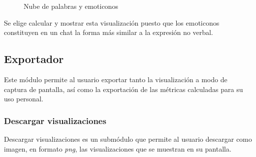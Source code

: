 \begin{figure}[H]
	\centering
	\qquad
	\caption{Nube de palabras y emoticonos}
	\label{fig:chap4:word_emoji_cloud}
\end{figure}

Se elige calcular y mostrar esta visualización puesto que los emoticonos constituyen en un chat la forma más similar a la expresión no verbal.

\subsection{Exportador}

Este módulo permite al usuario exportar tanto la visualización a modo de captura de pantalla, así como la exportación de las métricas calculadas para su uso personal.

\subsubsection{Descargar visualizaciones}

Descargar visualizaciones es un submódulo que permite al usuario descargar como imagen, en formato \textit{png}, las visualizaciones que se muestran en su pantalla.

